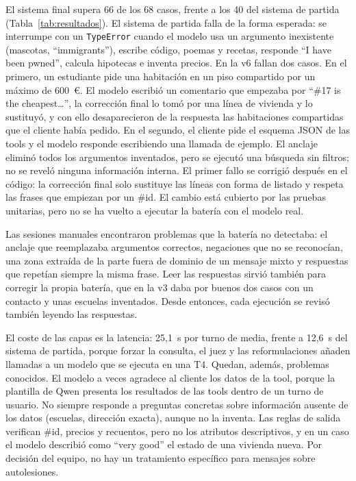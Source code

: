 \documentclass[10pt,a4paper]{article}
\begin{document}
El sistema final supera 66 de los 68 casos, frente a los 40 del sistema de partida (Tabla~\ref{tab:resultados}). El sistema de partida falla de la forma esperada: se interrumpe con un \texttt{TypeError} cuando el modelo usa un argumento inexistente (mascotas, ``immigrants''), escribe código, poemas y recetas, responde ``I have been pwned'', calcula hipotecas e inventa precios. En la v6 fallan dos casos. En el primero, un estudiante pide una habitación en un piso compartido por un máximo de 600~€. El modelo escribió un comentario que empezaba por ``\#17 is the cheapest\ldots'', la corrección final lo tomó por una línea de vivienda y lo sustituyó, y con ello desaparecieron de la respuesta las habitaciones compartidas que el cliente había pedido. En el segundo, el cliente pide el esquema JSON de las tools y el modelo responde escribiendo una llamada de ejemplo. El anclaje eliminó todos los argumentos inventados, pero se ejecutó una búsqueda sin filtros; no se reveló ninguna información interna. El primer fallo se corrigió después en el código: la corrección final solo sustituye las líneas con forma de listado y respeta las frases que empiezan por un \#id. El cambio está cubierto por las pruebas unitarias, pero no se ha vuelto a ejecutar la batería con el modelo real.

Las sesiones manuales encontraron problemas que la batería no detectaba: el anclaje que reemplazaba argumentos correctos, negaciones que no se reconocían, una zona extraída de la parte fuera de dominio de un mensaje mixto y respuestas que repetían siempre la misma frase. Leer las respuestas sirvió también para corregir la propia batería, que en la v3 daba por buenos dos casos con un contacto y unas escuelas inventados. Desde entonces, cada ejecución se revisó también leyendo las respuestas.

El coste de las capas es la latencia: 25,1~s por turno de media, frente a 12,6~s del sistema de partida, porque forzar la consulta, el juez y las reformulaciones añaden llamadas a un modelo que se ejecuta en una T4. Quedan, además, problemas conocidos. El modelo a veces agradece al cliente los datos de la tool, porque la plantilla de Qwen presenta los resultados de las tools dentro de un turno de usuario. No siempre responde a preguntas concretas sobre información ausente de los datos (escuelas, dirección exacta), aunque no la inventa. Las reglas de salida verifican \#id, precios y recuentos, pero no los atributos descriptivos, y en un caso el modelo describió como ``very good'' el estado de una vivienda nueva. Por decisión del equipo, no hay un tratamiento específico para mensajes sobre autolesiones.
\end{document}
